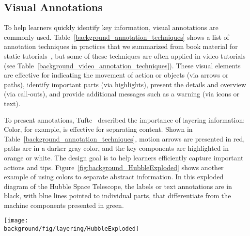 
\subsection{Visual Annotations}

To help learners quickly identify key information, visual annotations are commonly used. Table~\ref{background_annotation_techniques} shows a list of annotation techniques in practices that we summarized from book material for static tutorials~\cite{mijksenaar1999open,cutting_representing_2002,greenberg2012sketching,Buxton:2007:SUE:1526229,tufte1990envisioning}, but some of these techniques are often applied in video tutorials (see Table~\ref{background_video_annotation_techniques}).
%
These visual elements are effective for indicating the movement of action or objects (via arrows or paths), identify important parts (via highlights), present the details and overview (via call-outs), and provide additional messages such as a warning (via icons or text).

To present annotations, Tufte~\cite{tufte1990envisioning} described the importance of layering information: 
%
Color, for example, is effective for separating content. Shown in Table~\ref{background_annotation_techniques}, motion arrows are presented in red, paths are in a darker gray color, and the key components are highlighted in orange or white. The design goal is to help learners efficiently capture important actions and tips.
%
Figure~\ref{fig:background_HubbleExploded} shows another example of using colors to separate abstract information. In this exploded diagram of the Hubble Space Telescope, the labels or text annotations are in black, with blue lines pointed to individual parts, that differentiate from the machine components presented in green.

\begin{figure*}[th!]
  \begin{minipage}{\textwidth}
    \centering
    \texttt{[image: \\background/fig/layering/HubbleExploded]}
  \caption[Color can differentiate between annotation (labels in black) and annotated information (parts in green in this diagram).]
  {
    Color can differentiate between annotation (labels in black) and annotated information (parts in green in this diagram\footnote{Image by AndrewBuck (Own work), ``Exploded diagram of the Hubble Space Telescope'', licensed under CC BY-SA 3.0}).
  }
  \label{fig:background_HubbleExploded}
  \end{minipage}
\end{figure*}

